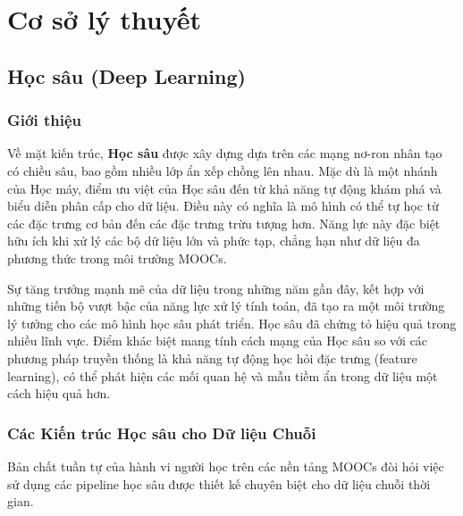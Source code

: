 \chapter{Cơ sở lý thuyết}
\label{chap:chap3}

\section{Học sâu (Deep Learning)}
\subsection{Giới thiệu}
Về mặt kiến trúc, \textbf{Học sâu} được xây dựng dựa trên các mạng nơ-ron nhân tạo có chiều sâu, bao gồm nhiều lớp ẩn xếp chồng lên nhau. Mặc dù là một nhánh của Học máy, điểm ưu việt của Học sâu đến từ khả năng tự động khám phá và biểu diễn phân cấp cho dữ liệu. Điều này có nghĩa là mô hình có thể tự học từ các đặc trưng cơ bản đến các đặc trưng trừu tượng hơn. Năng lực này đặc biệt hữu ích khi xử lý các bộ dữ liệu lớn và phức tạp, chẳng hạn như dữ liệu đa phương thức trong môi trường MOOCs.

Sự tăng trưởng mạnh mẽ của dữ liệu trong những năm gần đây, kết hợp với những tiến bộ vượt bậc của năng lực xử lý tính toán, đã tạo ra một môi trường lý tưởng cho các mô hình học sâu phát triển. Học sâu đã chứng tỏ hiệu quả trong nhiều lĩnh vực. Điểm khác biệt mang tính cách mạng của Học sâu so với các phương pháp truyền thống là khả năng tự động học hỏi đặc trưng (feature learning), có thể phát hiện các mối quan hệ và mẫu tiềm ẩn trong dữ liệu một cách hiệu quả hơn.

\subsection{Các Kiến trúc Học sâu cho Dữ liệu Chuỗi}
Bản chất tuần tự của hành vi người học trên các nền tảng MOOCs đòi hỏi việc sử dụng các pipeline học sâu được thiết kế chuyên biệt cho dữ liệu chuỗi thời gian.

